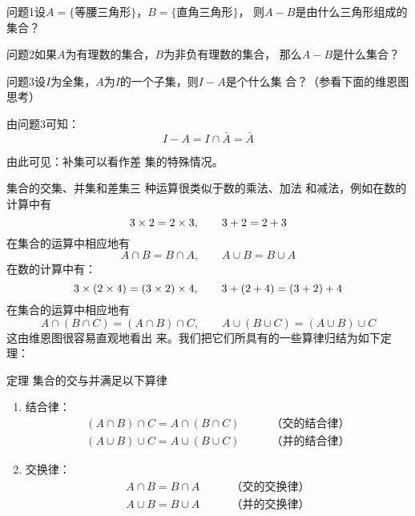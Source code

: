 \begin{blk}
    {问题1}设$A=\{\text{等腰三角形}\}$，$B=\{\text{直角三角形}\}$，
    则$A-B$是由什么三角形组成的集合？
\end{blk}


\begin{blk}
     {问题2}如果$A$为有理数的集合，$B$为非负有理数的集合，
    那么$A-B$是什么集合？
\end{blk}

\begin{blk}
     {问题3}设$I$为全集，$A$为$I$的一个子集，则$I-A$是个什么集
    合？（参看下面的维恩图思考）
\end{blk}

由问题3可知：
\[I-A=I\cap \bar A=\bar A\]

由此可见：补集可以看作差
集的特殊情况。

\begin{figure}[htp]
    \centering
{}
    \caption{}
\end{figure}


集合的交集、并集和差集三
种运算很类似于数的乘法、加法
和减法，例如在数的计算中有
\[3\times2=2\times 3,\qquad 3+2=2+3\] 
在集合的运算中相应地有\[A\cap B=B\cap A,\qquad  A\cup B=B\cup A\]
在数的计算中有：
\[3\times(2\times4)=(3\times2)\times4,\qquad 3+(2+4)=(3+2)+4\]
在集合的运算中相应地有
\[A\cap (B\cap C)=(A\cap B)\cap C,\qquad 
A\cup (B\cup C)=(A\cup B)\cup C\]
这由维恩图很容易直观地看出
来。我们把它们所具有的一些算律归结为如下定理：

\begin{blk}
{定理} 集合的交与并满足以下算律
\begin{enumerate}
\item 结合律：
\[\begin{split}
     (A\cap B)\cap C=A\cap (B\cap C)&\qquad \text{（交的结合律）}\\
     (A\cup B)\cup C=A\cup (B\cup C)&\qquad \text{（并的结合律）}
\end{split} \]
\item 交换律：
\[\begin{split}
    A\cap B=B\cap A&\qquad \text{（交的交换律）}\\
    A\cup B=B\cup A&\qquad \text{（并的交换律）}
\end{split} \]
\end{enumerate}
\end{blk}

